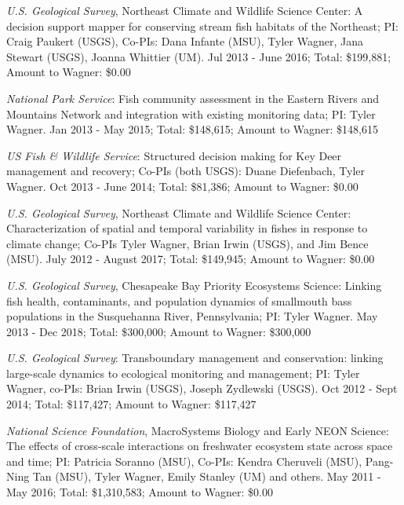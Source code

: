 \documentclass[10pt]{article}
\begin{document}
\begin{flushleft}
\begin{etaremune}
\item {\sl U.S. Geological Survey}, Northeast Climate and Wildlife Science Center: A decision support mapper for conserving stream fish habitats of the Northeast; PI: Craig Paukert (USGS), Co-PIs: Dana Infante (MSU), Tyler Wagner, Jana Stewart (USGS), Joanna Whittier (UM). Jul 2013 - June 2016; Total: \$199,881; Amount to Wagner: \$0.00

\item {\sl National Park Service}: Fish community assessment in the Eastern Rivers and Mountains Network and integration with existing monitoring data; PI: Tyler Wagner. Jan 2013 - May 2015;  Total: \$148,615; Amount to Wagner: \$148,615

\item {\sl US Fish \& Wildlife Service}: Structured decision making for Key Deer management and recovery; Co-PIs (both USGS): Duane Diefenbach, Tyler Wagner. Oct 2013 - June 2014; Total: \$81,386; Amount to Wagner: \$0.00

\item {\sl U.S. Geological Survey}, Northeast Climate and Wildlife Science Center: Characterization of spatial and temporal variability in fishes in response to climate change; Co-PIs Tyler Wagner, Brian Irwin (USGS), and Jim Bence (MSU). July 2012 - August 2017; Total: \$149,945; Amount to Wagner: \$0.00

\item {\sl  U.S. Geological Survey},  Chesapeake Bay Priority Ecosystems Science: Linking fish health, contaminants, and population dynamics of smallmouth bass populations in the Susquehanna River, Pennsylvania; PI: Tyler Wagner. May 2013 - Dec 2018; Total: \$300,000; Amount to Wagner: \$300,000

\item {\sl  U.S. Geological Survey}: Transboundary management and conservation: linking large-scale dynamics to ecological monitoring and management; PI: Tyler Wagner, co-PIs: Brian Irwin (USGS), Joseph Zydlewski (USGS). Oct 2012 - Sept 2014; Total: \$117,427; Amount to Wagner: \$117,427

\item {\sl National Science Foundation},  MacroSystems Biology and Early NEON Science: The effects of cross-scale interactions on freshwater ecosystem state across space and time; PI: Patricia Soranno (MSU), Co-PIs: Kendra Cheruveli (MSU), Pang-Ning Tan (MSU), Tyler Wagner, Emily Stanley (UM) and others. May 2011 - May 2016; Total: \$1,310,583;  Amount to Wagner: \$0.00


\end{etaremune}
\end{flushleft}
\end{document}

